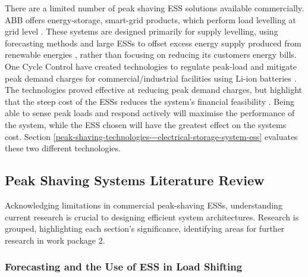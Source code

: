 There are a limited number of peak shaving ESS solutions available
commercially. ABB offers energy-storage, smart-grid products, which
perform load levelling at grid level \cite{abbpeakshave}. These systems
are designed primarily for supply levelling, using forecasting methods
and large ESSs to offset excess energy supply produced from renewable
energies \cite{5559470}, rather than focusing on reducing its customers
energy bills. One Cycle Control have created technologies to regulate
peak-load and mitigate peak demand charges for commercial/industrial
facilities using Li-ion batteries \cite{peakload38:online}. The
technologies proved effective at reducing peak demand charges, but
highlight that the steep cost of the ESSs reduces the system's financial
feasibility \cite{Demonstr51:online}. Being able to sense peak loads and
respond actively will maximise the performance of the system, while the
ESS chosen will have the greatest effect on the systems cost. Section
\ref{peak-shaving-technologies---electrical-storage-system-ess}
evaluates these two different technologies.

\subsection{Peak Shaving Systems Literature
Review}\label{peak-shaving-systems-literature-review}

Acknowledging limitations in commercial peak-shaving ESSs, understanding
current research is crucial to designing efficient system architectures.
Research is grouped, highlighting each section's significance,
identifying areas for further research in work package 2.

\subsubsection{Forecasting and the Use of ESS in Load
Shifting}\label{forecasting-and-the-use-of-ess-in-load-shifting}

